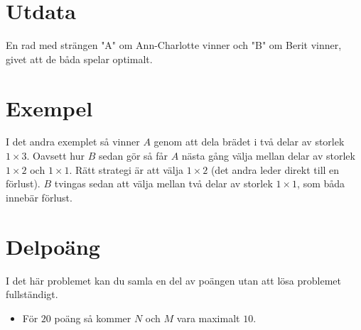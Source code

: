 \section*{Utdata}

En rad med strängen "A" om Ann-Charlotte vinner och "B" om Berit vinner, givet att de båda spelar optimalt.

\section*{Exempel}
I det andra exemplet så vinner $A$ genom att dela brädet i två delar av storlek $1 \times 3$. Oavsett hur $B$ sedan gör så får $A$ nästa gång välja mellan delar av storlek $1 \times 2$ och $1 \times 1$. Rätt strategi är att välja $1 \times 2$ (det andra leder direkt till en förlust). $B$ tvingas sedan att välja mellan två delar av storlek $1 \times 1$, som båda innebär förlust.

\section*{Delpoäng}

I det här problemet kan du samla en del av poängen utan att
lösa problemet fullständigt.

\begin{itemize}
    \item För $20$ poäng så kommer $N$ och $M$ vara maximalt $10$.
\end{itemize}
